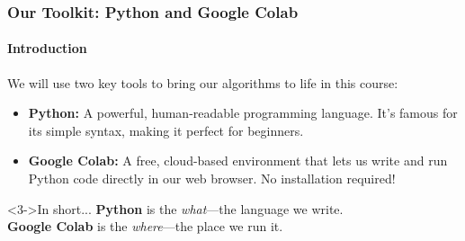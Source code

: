 \documentclass{beamer}
\begin{document}
\begin{frame}[fragile]
    \frametitle{Our Toolkit: Python and Google Colab}
    \framesubtitle{Introduction}
    
    We will use two key tools to bring our algorithms to life in this course:
    
    \vspace{1em}
    
    \begin{itemize}
        \item<1-> \textbf{Python:} A powerful, human-readable programming language. It's famous for its simple syntax, making it perfect for beginners.
        
        \vspace{1em}
        
        \item<2-> \textbf{Google Colab:} A free, cloud-based environment that lets us write and run Python code directly in our web browser. No installation required!
    \end{itemize}
    
    \vspace{1em}
    
    \begin{block}<3->{In short...}
        \textbf{Python} is the \textit{what}---the language we write. \\
        \textbf{Google Colab} is the \textit{where}---the place we run it.
    \end{block}

\end{frame}
\end{document}
